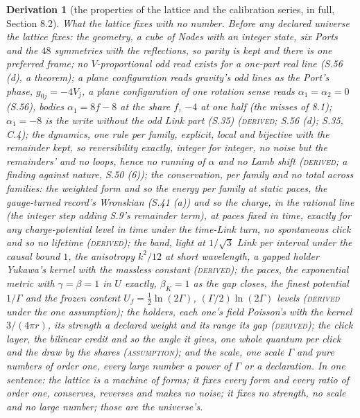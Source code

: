 \documentclass[pdflatex,sn-mathphys-num]{sn-jnl}
\newcommand{\claimmark}[1]{\textup{\textsc{#1}}}
\theoremstyle{thmstyleone}
\newtheorem{derivation}{Derivation}
\begin{document}
\begin{derivation}[the properties of the lattice and the calibration series, in full, Section 8.2]
\emph{What the lattice fixes with no number.} Before any declared universe the lattice fixes: the geometry, a cube of Nodes with an integer state, six Ports and the $48$ symmetries with the reflections, so parity is kept and there is one preferred frame; no $V$-proportional odd read exists for a one-part real line (S.56 (d), a theorem); a plane configuration reads gravity's odd lines as the Port's phase, $g_{0j} = -4V_j$, a plane configuration of one rotation sense reads $\alpha_1 = \alpha_2 = 0$ (S.56), bodies $\alpha_1 = 8f - 8$ at the share $f$, $-4$ at one half (the misses of 8.1); $\alpha_1 = -8$ is the write without the odd Link part (S.35) (\claimmark{derived}; S.56 (d); S.35, C.4); the dynamics, one rule per family, explicit, local and bijective with the remainder kept, so reversibility exactly, integer for integer, no noise but the remainders' and no loops, hence no running of $\alpha$ and no Lamb shift (\claimmark{derived}; a finding against nature, S.50 (6)); the conservation, per family and no total across families: the weighted form and so the energy per family at static paces, the gauge-turned record's Wronskian (S.41 (a)) and so the charge, in the rational line (the integer step adding S.9's remainder term), at paces fixed in time, exactly for any charge-potential level in time under the time-Link turn, no spontaneous click and so no lifetime (\claimmark{derived}); the band, light at $1 / \sqrt 3$ Link per interval under the causal bound $1$, the anisotropy $k^2 / 12$ at short wavelength, a gapped holder Yukawa's kernel with the massless constant (\claimmark{derived}); the paces, the exponential metric with $\gamma = \beta = 1$ in $U$ exactly, $\beta_K = 1$ as the gap closes, the finest potential $1 / \Gamma$ and the frozen content $U_f = \frac12\ln(2\Gamma)$, $(\Gamma / 2)\ln(2\Gamma)$ levels (\claimmark{derived} under the one assumption); the holders, each one's field Poisson's with the kernel $3 / (4\pi r)$, its strength a declared weight and its range its gap (\claimmark{derived}); the click layer, the bilinear credit and so the angle it gives, one whole quantum per click and the draw by the shares (\claimmark{assumption}); and the scale, one scale $\Gamma$ and pure numbers of order one, every large number a power of $\Gamma$ or a declaration. In one sentence: the lattice is a machine of forms; it fixes every form and every ratio of order one, conserves, reverses and makes no noise; it fixes no strength, no scale and no large number; those are the universe's.


\end{derivation}
\end{document}

